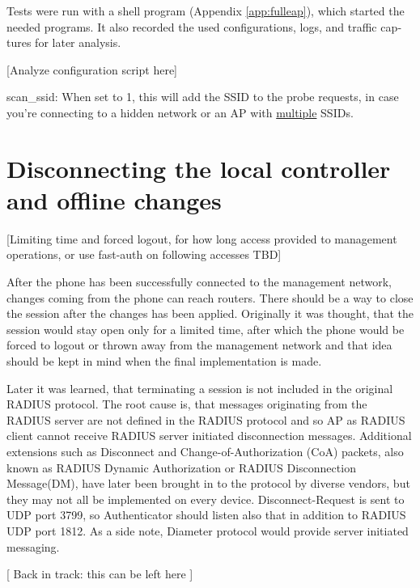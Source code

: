 \documentclass[12pt,a4paper,english]{tutthesis}
\begin{document}
\begin{otherlanguage}{english}
Tests were run with a shell program (Appendix \ref{app:fulleap}), which
started the needed programs. It also recorded the used configurations, logs,
and traffic captures for later analysis.

[Analyze configuration script here]

scan\_ssid: When set to 1, this will add the SSID to the probe
requests, in case you're connecting to a hidden network or an AP with
\uline{multiple} SSIDs.

\section{Disconnecting the local controller and offline changes}
\label{sec-5-3}
\label{sec:disconnections}
[Limiting time and forced logout, for how long access provided to
management operations, or use fast-auth on following accesses TBD]

After the phone has been successfully connected to the management network,
changes coming from 
the phone can reach routers.  There should be a way to close the session after
the changes has been applied. Originally it was thought, that the session
would stay open only for a limited time, after which the phone would be forced to
logout or thrown away from the management network and that idea should be
kept in mind when the final implementation is made.





Later it was learned, that terminating a session is not included in the original RADIUS protocol.
The root cause is, that messages originating from the RADIUS server
are not defined in the RADIUS protocol and so AP as RADIUS client cannot
receive RADIUS server initiated disconnection messages. 
Additional
extensions such as Disconnect and Change-of-Authorization (CoA)
packets, also known as RADIUS Dynamic Authorization or RADIUS
Disconnection Message(DM), have later been brought in\cite{rfc5176}
to the protocol by diverse vendors, but they may not all be implemented on
every device.
Disconnect-Request is sent to UDP port 3799, so Authenticator should
listen also that in addition to RADIUS UDP port 1812.
As a side note, Diameter protocol would provide server initiated messaging.












[ Back in track: this can be left here ]


\end{otherlanguage}
\end{document}
